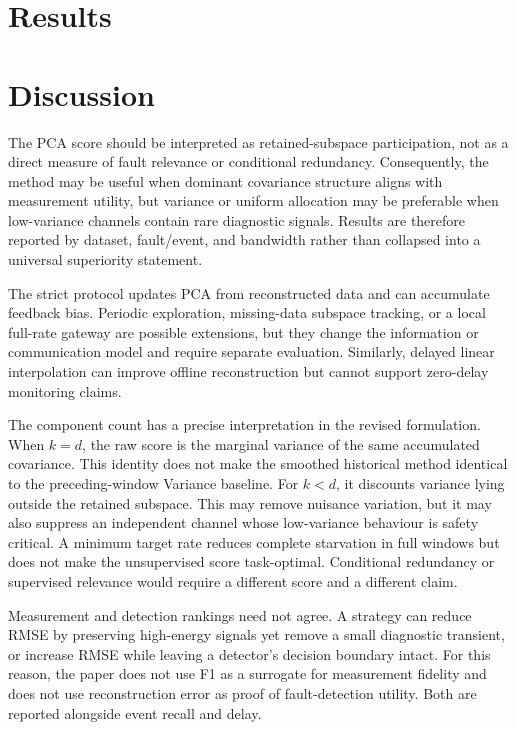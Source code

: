 \documentclass[12pt]{article}
\begin{document}
\section{Results}


\section{Discussion}

The PCA score should be interpreted as retained-subspace participation, not as
a direct measure of fault relevance or conditional redundancy. Consequently,
the method may be useful when dominant covariance structure aligns with
measurement utility, but variance or uniform allocation may be preferable when
low-variance channels contain rare diagnostic signals. Results are therefore
reported by dataset, fault/event, and bandwidth rather than collapsed into a
universal superiority statement.

The strict protocol updates PCA from reconstructed data and can accumulate
feedback bias. Periodic exploration, missing-data subspace tracking, or a local
full-rate gateway are possible extensions, but they change the information or
communication model and require separate evaluation. Similarly, delayed
linear interpolation can improve offline reconstruction but cannot support
zero-delay monitoring claims.

The component count has a precise interpretation in the revised formulation.
When $k=d$, the raw score is the marginal variance of the same accumulated
covariance. This identity does not make the smoothed historical method identical
to the preceding-window Variance baseline.
For $k<d$, it discounts variance lying outside the retained subspace. This may
remove nuisance variation, but it may also suppress an independent channel
whose low-variance behaviour is safety critical. A minimum target rate reduces complete
starvation in full windows but does not make the unsupervised score task-optimal. Conditional
redundancy or supervised relevance would require a different score and a
different claim.

Measurement and detection rankings need not agree. A strategy can reduce RMSE
by preserving high-energy signals yet remove a small diagnostic transient, or
increase RMSE while leaving a detector's decision boundary intact. For this
reason, the paper does not use F1 as a surrogate for measurement fidelity and
does not use reconstruction error as proof of fault-detection utility. Both are
reported alongside event recall and delay.
\end{document}
